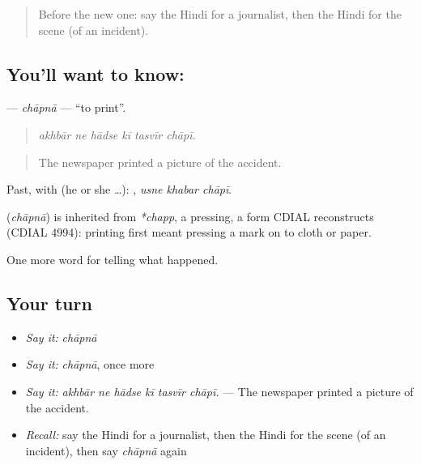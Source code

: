 \begin{quote}
Before the new one: say the Hindi for a journalist, then the Hindi for the scene (of an incident).
\end{quote}

\subsection*{You'll want to know: }
\textbf{} — \emph{chāpnā} — \textquotedblleft{}to print\textquotedblright{}.

\begin{quote}
     
\end{quote}

\begin{quote}
\emph{akhbār ne hādse kī tasvīr chāpī.}
\end{quote}

\begin{quote}
The newspaper printed a picture of the accident.
\end{quote}

Past, with  (he or she …):   , \emph{usne khabar chāpī}.

\begin{cousinweb}
\textbf{} (\emph{chāpnā}) is inherited from \emph{*chapp}, a pressing, a form CDIAL reconstructs (CDIAL 4994): printing first meant pressing a mark on to cloth or paper.
\end{cousinweb}

\begin{grammarlens}[title={What you've built}]
One more word for telling what happened.
\end{grammarlens}

\subsection*{Your turn}
\begin{itemize}
\raggedright
  \item \emph{Say it:} \emph{chāpnā}
  \item \emph{Say it:} \emph{chāpnā}, once more
  \item \emph{Say it:} \emph{akhbār ne hādse kī tasvīr chāpī.} — The newspaper printed a picture of the accident.
  \item \emph{Recall:} say the Hindi for a journalist, then the Hindi for the scene (of an incident), then say \emph{chāpnā} again
\end{itemize}

